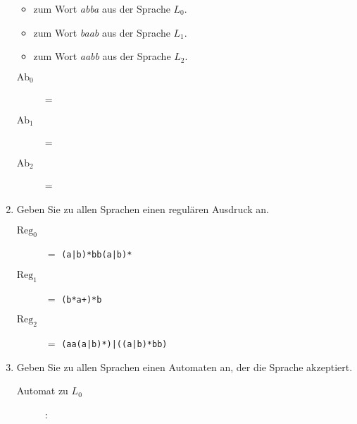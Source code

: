 \documentclass{lehramt-informatik-aufgabe}
\begin{document}
\begin{enumerate}
\begin{itemize}
\item zum Wort \emph{abba} aus der Sprache $L_0$.
\item zum Wort \emph{baab} aus der Sprache $L_1$.
\item zum Wort \emph{aabb} aus der Sprache $L_2$.
\end{itemize}

\begin{liAntwort}
\begin{description}
\item[$\text{Ab}_0$] = 
\item[$\text{Ab}_1$] = 
\item[$\text{Ab}_2$] = 
\end{description}

\end{liAntwort}

\item Geben Sie zu allen Sprachen einen regulären Ausdruck an.

\begin{liAntwort}
\begin{description}
\item[$\text{Reg}_0$] $=$ \texttt{(a|b)*bb(a|b)*}

\item[$\text{Reg}_1$] $=$ \texttt{(b*a+)*b}

\item[$\text{Reg}_2$] $=$ \texttt{(aa(a|b)*)|((a|b)*bb)}
\end{description}
\end{liAntwort}


\item Geben Sie zu allen Sprachen einen Automaten an, der die Sprache
akzeptiert.

\begin{description}

\item[Automat zu $L_0$]:

\begin{liAntwort}
\begin{center}
\end{center}
\end{liAntwort}
\end{description}
\end{enumerate}
\end{document}
